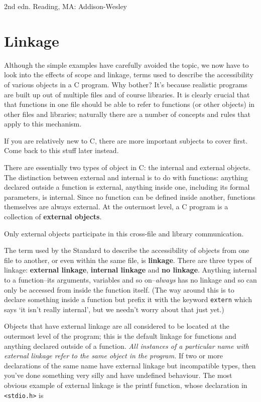  2nd edn.
     Reading, MA: Addison-Wesley


        \section{Linkage}
        

  

  Although the simple examples have carefully avoided the topic, we now
   have to look into the effects of scope and linkage, terms used to
   describe the accessibility of various objects in a C program. Why bother?
   It's because realistic programs are built up out of multiple files and of
   course libraries. It is clearly crucial that that functions in one file
   should be able to refer to functions (or other objects) in other files
   and libraries; naturally there are a number of concepts and rules that
   apply to this mechanism.


  If you are relatively new to C, there are more important subjects to
   cover first. Come back to this stuff later instead.


  There are essentially two types of object in C: the internal and
   external objects. The distinction between external and internal is to do
   with functions: anything declared outside a function is external,
   anything inside one, including its formal parameters, is internal. Since
   no function can be defined inside another, functions themselves are
   always external. At the outermost level, a C program is a collection of
   \textbf{external objects}.


  Only external objects participate in this cross-file and library
   communication.


  The term used by the Standard to describe the accessibility of objects
   from one file to another, or even within the same file, is
   \textbf{linkage}. There are three types of linkage: \textbf{external
   linkage}, \textbf{internal linkage} and \textbf{no linkage}.
   Anything internal to a function--its arguments, variables and so
   on--\textit{always} has no linkage and so can only be accessed from
   inside the function itself. (The way around this is to declare something
   inside a function but prefix it with the keyword \texttt{extern}
   which says `it isn't really internal', but we needn't worry about
   that just yet.)


  Objects that have external linkage are all considered to be located at
   the outermost level of the program; this is the default linkage for
   functions and anything declared outside of a function. \textit{All instances
    of a particular name with external linkage refer to the same object in
    the program.} If two or more declarations of the same name have
   external linkage but incompatible types, then you've done something very
   silly and have undefined behaviour. The most obvious example of external
   linkage is the printf function, whose declaration in
   \texttt{<stdio.h>} is

